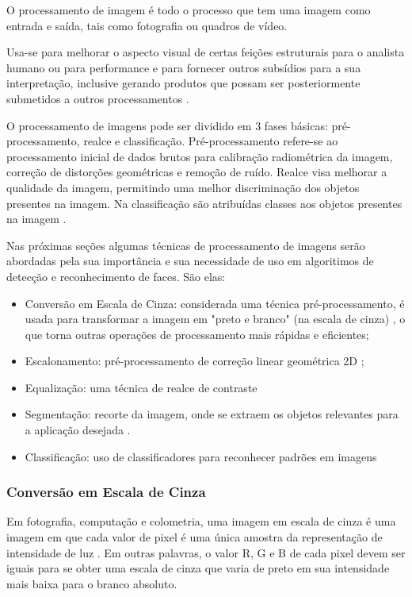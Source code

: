 O processamento de imagem é todo o processo que tem uma imagem como entrada e saída, tais como fotografia ou quadros de vídeo. 

Usa-se para melhorar o aspecto visual de certas feições estruturais para o analista humano ou para performance e para fornecer outros subsídios para a sua interpretação, inclusive gerando produtos que possam ser posteriormente submetidos a outros processamentos \cite{inpe_proc_img}.

O processamento de imagens pode ser dividido em 3 fases básicas: pré-processamento, realce e classificação.
Pré-processamento refere-se ao processamento inicial de dados brutos para calibração radiométrica da imagem, correção de distorções geométricas e remoção de ruído.
Realce visa melhorar a qualidade da imagem, permitindo uma melhor discriminação dos objetos presentes na imagem.
Na classificação são atribuídas classes aos objetos presentes na imagem \cite{inpe_proc_img}.

Nas próximas seções algumas técnicas de processamento de imagens serão abordadas pela sua importância e sua necessidade de uso em algoritimos de detecção e reconhecimento de faces. São elas:

\begin{itemize}
	\item Conversão em Escala de Cinza: considerada uma técnica pré-processamento, é usada para transformar a imagem em "preto e branco" (na escala de cinza) , o que torna outras operações de processamento mais rápidas e eficientes;
	\item Escalonamento: pré-processamento de correção linear geométrica 2D \cite{lapix_escala};
	\item Equalização: uma técnica de realce de contraste \cite{gonzalez_woods}
	\item Segmentação: recorte da imagem, onde se extraem os objetos relevantes para a aplicação desejada \cite{inpe_proc_img}.
	\item Classificação: uso de classificadores para reconhecer padrões em imagens \cite{drmathew_java_programming}
\end{itemize}

\subsubsection{Conversão em Escala de Cinza}\label{subsubsec:filtros}

Em fotografia, computação e colometria, uma imagem em escala de cinza é uma imagem em que cada valor de pixel é uma única amostra da representação de intensidade de luz \cite{stephen_greyscale}. Em outras palavras, o valor R, G e B de cada pixel devem ser iguais para se obter uma escala de cinza que varia de preto em sua intensidade mais baixa para o branco absoluto.

